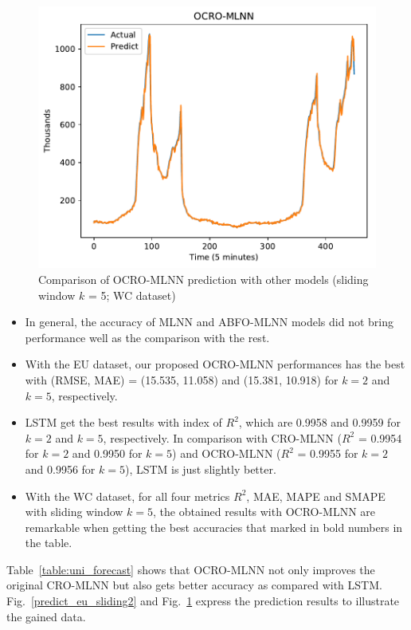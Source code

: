 \documentclass[11pt,twoside]{article}
\begin{document}
\begin{multicols}{2}
\begin{figure}[!ht]
\begin{minipage}[b]{0.33\linewidth}
    \includegraphics[width=0.9\linewidth]{predict/k5/wc_k5_ocro_mlnn.pdf} 
  \end{minipage} 
  \caption{Comparison of OCRO-MLNN prediction with other models (sliding window $k$ = 5; WC dataset)} 
  \label{predict_wc_sliding5} 
\end{figure}



\begin{itemize}
	\item In general, the accuracy of MLNN and ABFO-MLNN models did not bring performance well as the comparison with the rest. 
	\item With the EU dataset, our proposed OCRO-MLNN performances has the best with (RMSE, MAE) = (15.535, 11.058) and (15.381, 10.918) for $k = 2$ and $k = 5$, respectively. 	
	\item LSTM get the best results with index of $R^{2}$, which are 0.9958 and 0.9959 for $k = 2$ and $k = 5$, respectively. In comparison with CRO-MLNN ($R^{2}$ = 0.9954 for $k = 2$ and 0.9950 for $k = 5$) and OCRO-MLNN ($R^2$ = 0.9955 for $k = 2$ and 0.9956 for $k = 5$), LSTM is just slightly better. 
	\item With the WC dataset, for all four metrics $R^2$, MAE, MAPE and SMAPE with sliding window $k = 5$, the obtained results with OCRO-MLNN are remarkable when getting the best accuracies that marked in bold numbers in the table. 
\end{itemize}


Table~\ref{table:uni_forecast} shows that OCRO-MLNN not only improves the original CRO-MLNN but also gets better accuracy as compared with LSTM. Fig.~\ref{predict_eu_sliding2} and Fig.~\ref{predict_wc_sliding5} express the prediction results to illustrate the gained data. 




\end{multicols}
\end{document}
